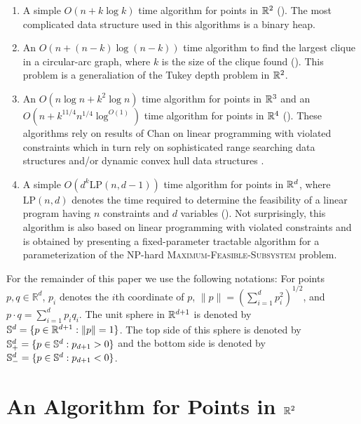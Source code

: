 \documentclass[charterfonts,lotsofwhite]{patmorin}
\newcommand{\lp}{\mathrm{LP}}
\begin{document}
\begin{enumerate}
\item A simple $O(n + k\log k)$ time algorithm for points in $\mathbb{R}^2$
().  The most complicated data structure used in this
algorithms is a binary heap.

\item An $O(n + (n-k)\log(n-k))$ time algorithm to find the largest
clique in a circular-arc graph, where $k$ is the size of the clique
found ().  This problem is a generaliation of the
Tukey depth problem in $\mathbb{R}^2$.

\item An $O(n\log n + k^2\log n)$ time algorithm for points in $\mathbb{R}^3$
and an $O(n + k^{11/4}n^{1/4}\log^{O(1)})$ time algorithm for points
in $\mathbb{R}^4$ ().  These algorithms rely on results of Chan
on linear programming with violated constraints \cite{X} which in turn
rely on sophisticated range searching data structures \cite{X} and/or
dynamic convex hull data structures \cite{X}.

\item A simple $O(d^k \lp(n,d-1))$ time algorithm for points in
$\mathbb{R}^d$, where $\lp(n,d)$ denotes the time required to determine the
feasibility of a linear program having $n$ constraints and $d$
variables ().  Not surprisingly, this algorithm is also
based on linear programming with violated constraints and is obtained
by presenting a fixed-parameter tractable algorithm for a
parameterization of the NP-hard \textsc{Maximum-Feasible-Subsystem}
problem.
\end{enumerate}

For the remainder of this paper we use the following notations: For
points $p,q\in\mathbb{R}^d$, $p_i$ denotes the $i$th coordinate of
$p$, $\|p\|=(\sum_{i=1}^d p_i^2)^{1/2}$, and $p\cdot
q=\sum_{i=1}^d p_iq_i$.  The unit sphere in $\mathbb{R}^{d+1}$ is denoted by
$\mathbb{S}^d =\{ p\in\mathbb{R}^{d+1} : \|p\|=1\}$. The top side of this sphere is
denoted by $\mathbb{S}^d_+ =\{ p\in\mathbb{S}^{d} : p_{d+1} > 0 \}$ and the bottom
side is denoted by $\mathbb{S}^d_- =\{ p\in\mathbb{S}^{d} : p_{d+1} < 0 \}$.



\section{An Algorithm for Points in $\mathbb{R}^2$}
\end{document}
